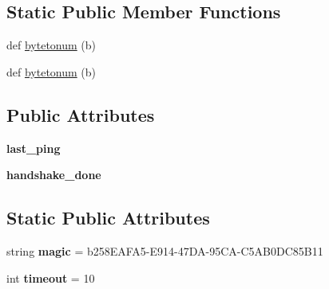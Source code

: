 \subsection*{Static Public Member Functions}
\begin{DoxyCompactItemize}
\item 
def \hyperlink{classremi_1_1server_1_1WebSocketsHandler_a40ab3d2a4ba344bfab9cb99d1fffccfe}{bytetonum} (b)
\item 
def \hyperlink{classremi_1_1server_1_1WebSocketsHandler_a40ab3d2a4ba344bfab9cb99d1fffccfe}{bytetonum} (b)
\end{DoxyCompactItemize}
\subsection*{Public Attributes}
\begin{DoxyCompactItemize}
\item 
{\bfseries last\+\_\+ping}\hypertarget{classremi_1_1server_1_1WebSocketsHandler_ab50ea42d37b23a2637af9517a32b12ca}{}\label{classremi_1_1server_1_1WebSocketsHandler_ab50ea42d37b23a2637af9517a32b12ca}

\item 
{\bfseries handshake\+\_\+done}\hypertarget{classremi_1_1server_1_1WebSocketsHandler_a63d2602009f714822b2f65dfe81dbc67}{}\label{classremi_1_1server_1_1WebSocketsHandler_a63d2602009f714822b2f65dfe81dbc67}

\end{DoxyCompactItemize}
\subsection*{Static Public Attributes}
\begin{DoxyCompactItemize}
\item 
string {\bfseries magic} = b\textquotesingle{}258\+E\+A\+F\+A5-\/\+E914-\/47\+D\+A-\/95\+C\+A-\/\+C5\+A\+B0\+D\+C85\+B11\textquotesingle{}\hypertarget{classremi_1_1server_1_1WebSocketsHandler_a94f17d53ef0d2c59e7250e1525d059ef}{}\label{classremi_1_1server_1_1WebSocketsHandler_a94f17d53ef0d2c59e7250e1525d059ef}

\item 
int {\bfseries timeout} = 10\hypertarget{classremi_1_1server_1_1WebSocketsHandler_a29a74fba709d2834073db2a33e240136}{}\label{classremi_1_1server_1_1WebSocketsHandler_a29a74fba709d2834073db2a33e240136}

\end{DoxyCompactItemize}


